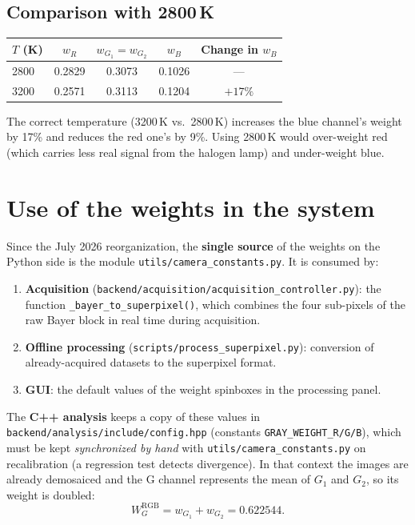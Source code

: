 \documentclass[11pt, a4paper]{article}
\begin{document}
\subsection{Comparison with 2800\,K}

\begin{center}
\begin{tabular}{lcccc}
\toprule
$T$ (K) & $w_R$ & $w_{G_1}=w_{G_2}$ & $w_B$ & Change in $w_B$ \\
\midrule
2800 & 0.2829 & 0.3073 & 0.1026 & — \\
3200 & 0.2571 & 0.3113 & 0.1204 & $+17\%$ \\
\bottomrule
\end{tabular}
\end{center}

The correct temperature (3200\,K vs.\ 2800\,K) increases the blue
channel's weight by 17\% and reduces the red one's by 9\%. Using
2800\,K would over-weight red (which carries less real signal from the
halogen lamp) and under-weight blue.

\section{Use of the weights in the system}

Since the July 2026 reorganization, the \textbf{single source} of the
weights on the Python side is the module
\texttt{utils/camera\_constants.py}. It is consumed by:

\begin{enumerate}
  \item \textbf{Acquisition} (\texttt{backend/acquisition/acquisition\_controller.py}):
        the function \texttt{\_bayer\_to\_superpixel()}, which combines
        the four sub-pixels of the raw Bayer block in real time during
        acquisition.

  \item \textbf{Offline processing} (\texttt{scripts/process\_superpixel.py}):
        conversion of already-acquired datasets to the superpixel format.

  \item \textbf{GUI}: the default values of the weight spinboxes in the
        processing panel.
\end{enumerate}

The \textbf{C++ analysis} keeps a copy of these values in
\texttt{backend/analysis/include/config.hpp} (constants
\texttt{GRAY\_WEIGHT\_R/G/B}), which must be kept \emph{synchronized by
hand} with \texttt{utils/camera\_constants.py} on recalibration (a
regression test detects divergence). In that context the images are
already demosaiced and the G channel represents the mean of $G_1$ and
$G_2$, so its weight is doubled:
\begin{equation}
  W_G^{\mathrm{RGB}} = w_{G_1} + w_{G_2} = 0.622544.
\end{equation}
\end{document}
